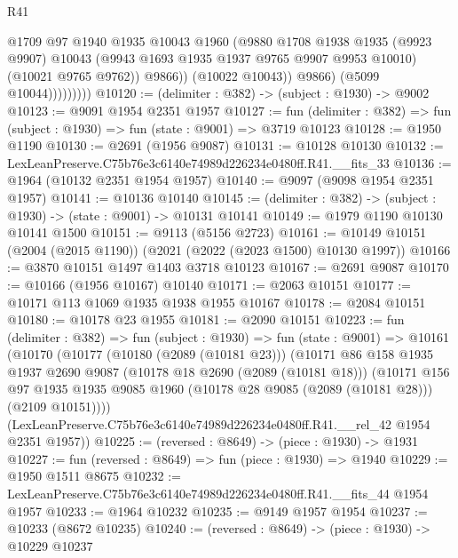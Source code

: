 \begin{lexlean}{R41}
\begin{coremodule}
                            @1709
                            @97
                            @1940
                            @1935
                            @10043
                            @1960
                            (@9880
                              @1708
                              @1938
                              @1935
                              (@9923 @9907)
                              @10043
                              (@9943 @1693 @1935 @1937 @9765 @9907 @9953 @10010)
                              (@10021 @9765 @9762))
                            @9866))
                        (@10022 @10043))
                      @9866)
                    (@5099 @10044)))))))))
@10120 := (delimiter : @382) -> (subject : @1930) -> @9002
@10123 := @9091 @1954 @2351 @1957
@10127 := fun (delimiter : @382) => fun (subject : @1930) => fun (state : @9001) => @3719 @10123
@10128 := @1950 @1190
@10130 := @2691 (@1956 @9087)
@10131 := @10128 @10130
@10132 := LexLeanPreserve.C75b76e3c6140e74989d226234e0480ff.R41.__fits_33
@10136 := @1964 (@10132 @2351 @1954 @1957)
@10140 := @9097 (@9098 @1954 @2351 @1957)
@10141 := @10136 @10140
@10145 := (delimiter : @382) -> (subject : @1930) -> (state : @9001) -> @10131 @10141
@10149 := @1979 @1190 @10130 @10141 @1500
@10151 := @9113 (@5156 @2723)
@10161 := @10149 @10151 (@2004 (@2015 @1190)) (@2021 (@2022 (@2023 @1500) @10130 @1997))
@10166 := @3870 @10151 @1497 @1403 @3718 @10123
@10167 := @2691 @9087
@10170 := @10166 (@1956 @10167) @10140
@10171 := @2063 @10151
@10177 := @10171 @113 @1069 @1935 @1938 @1955 @10167
@10178 := @2084 @10151
@10180 := @10178 @23 @1955
@10181 := @2090 @10151
@10223 := fun (delimiter : @382) =>
  fun (subject : @1930) =>
  fun (state : @9001) =>
  @10161
    (@10170
      (@10177
        (@10180 (@2089 (@10181 @23)))
        (@10171
          @86
          @158
          @1935
          @1937
          @2690
          @9087
          (@10178 @18 @2690 (@2089 (@10181 @18)))
          (@10171
            @156
            @97
            @1935
            @1935
            @9085
            @1960
            (@10178 @28 @9085 (@2089 (@10181 @28)))
            (@2109 @10151))))
      (LexLeanPreserve.C75b76e3c6140e74989d226234e0480ff.R41.__rel_42 @1954 @2351 @1957))
@10225 := (reversed : @8649) -> (piece : @1930) -> @1931
@10227 := fun (reversed : @8649) => fun (piece : @1930) => @1940
@10229 := @1950 @1511 @8675
@10232 := LexLeanPreserve.C75b76e3c6140e74989d226234e0480ff.R41.__fits_44 @1954 @1957
@10233 := @1964 @10232
@10235 := @9149 @1957 @1954
@10237 := @10233 (@8672 @10235)
@10240 := (reversed : @8649) -> (piece : @1930) -> @10229 @10237

\end{coremodule}
\end{lexlean}

